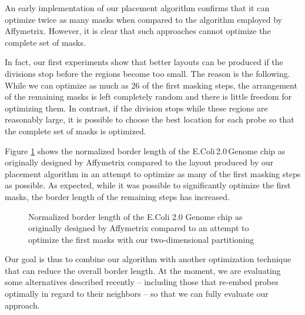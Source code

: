 \documentclass{llncs}
\begin{document}
An early implementation of our placement algorithm confirms that it can optimize twice as many masks when compared to the algorithm employed by Affymetrix. However, it is clear that such approaches cannot optimize the complete set of masks.

In fact, our first experiments show that better layouts can be produced if the divisions stop before the regions become too small. The reason is the following. While we can optimize as much as 26 of the first masking steps, the arrangement of the remaining masks is left completely random and there is little freedom for optimizing them. In contrast, if the division stops while these regions are reasonably large, it is possible to choose the best location for each probe so that the complete set of masks is optimized.

Figure \ref{fig:EC2_borderlength} shows the normalized border length of the E.Coli\,2.0\,Genome chip as originally designed by Affymetrix compared to the layout produced by our placement algorithm in an attempt to optimize as many of the first masking steps as possible. As expected, while it was possible to significantly optimize the first masks, the border length of the remaining steps has increased.

\begin{figure}[p]
\begin{center}

\end{center}
\vspace*{-2ex}
\caption{Normalized border length of the E.Coli 2.0 Genome chip as originally designed by Affymetrix compared to an attempt to optimize the first masks with our two-dimensional partitioning}
\label{fig:EC2_borderlength}
\end{figure} 

Our goal is thus to combine our algorithm with another optimization technique that can reduce the overall border length. At the moment, we are evaluating some alternatives described recently \cite{KAHNG03B} -- including those that re-embed probes optimally in regard to their neighbors -- so that we can fully evaluate our approach.

\footnotesize
\end{document}
